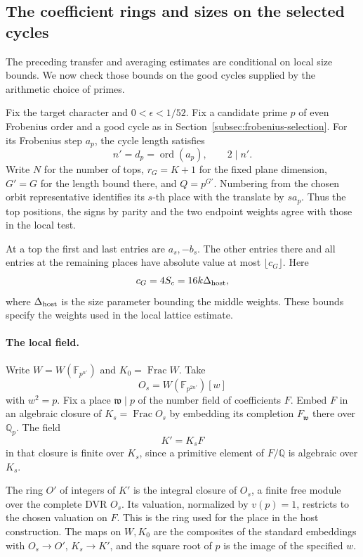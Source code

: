 \subsection{The coefficient rings and sizes on the selected cycles}
\label{sec:host-edge-tests}
\hypertarget{source-host-edge-tests}{}

The preceding transfer and averaging estimates are conditional on local size bounds. We now check those bounds on the good cycles supplied by the arithmetic choice of primes.

Fix the target character and \(0<\epsilon<1/52\). Fix a candidate prime \(p\) of even Frobenius order and a good cycle as in Section~\ref{subsec:frobenius-selection}. For its Frobenius step \(a_p\), the cycle length satisfies
\[
 n'=d_p=\operatorname{ord}(a_p),\qquad 2\mid n'.
\] Write \(N\) for the
number of tops, \(r_G=K+1\) for the fixed plane dimension,
\(G'=G\) for the length bound there, and \(Q=p^{G'}\).
Numbering from the chosen orbit representative identifies its
\(s\)-th place with the translate by \(s a_p\). Thus the top
positions, the signs by parity and the two endpoint weights agree
with those in the local test.

At a top the first and last entries
are \(a_s,-b_s\). The other entries there and all entries at the
remaining places have absolute value at most \(\lfloor c_G\rfloor\).
Here
\[
 c_G=4S_c=16k\Delta_{\rm host},
\]
where \(\Delta_{\rm host}\)
is the size parameter bounding the middle weights. These bounds specify the weights used in the local lattice estimate.

\paragraph{The local field.}
Write \(W=W(\mathbb F_{p^{n'}})\) and \(K_0=\operatorname{Frac}W\).
Take
\[
 O_s=W(\mathbb F_{p^{2n'}})[w]
\]
with \(w^2=p\). Fix a
place \(\mathfrak w\mid p\) of the number field of coefficients
\(F\). Embed \(F\) in an algebraic closure of
\(K_s=\operatorname{Frac}O_s\) by embedding its completion
\(F_{\mathfrak w}\) there over \(\mathbb Q_p\). The field
\[
 K'=K_s F
\]
in that closure is finite over \(K_s\), since a
primitive element of \(F/\mathbb Q\) is algebraic over \(K_s\).

The ring \(O'\) of integers of \(K'\) is the integral closure
of \(O_s\), a finite free module over the complete DVR \(O_s\).
Its valuation, normalized by \(v(p)=1\), restricts to the chosen
valuation on \(F\). This is the ring used for the place in the
host construction. The maps on \(W,K_0\) are the composites of the
standard embeddings with \(O_s\to O'\), \(K_s\to K'\), and the
square root of \(p\) is the image of the specified \(w\).

